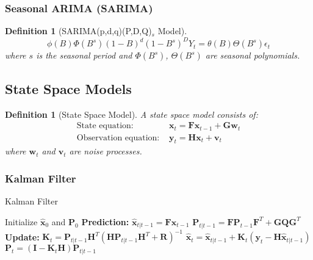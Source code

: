 \documentclass[11pt,a4paper]{article}
\newtheorem{definition}[theorem]{Definition}
\begin{document}
\subsubsection{Seasonal ARIMA (SARIMA)}

\begin{definition}[SARIMA(p,d,q)(P,D,Q)$_s$ Model]
$$\phi(B)\Phi(B^s)(1-B)^d(1-B^s)^D Y_t = \theta(B)\Theta(B^s)\epsilon_t$$
where $s$ is the seasonal period and $\Phi(B^s)$, $\Theta(B^s)$ are seasonal polynomials.
\end{definition}

\subsection{State Space Models}

\begin{definition}[State Space Model]
A state space model consists of:
\begin{align}
\text{State equation: } & \mathbf{x}_t = \mathbf{F}\mathbf{x}_{t-1} + \mathbf{G}\mathbf{w}_t \\
\text{Observation equation: } & \mathbf{y}_t = \mathbf{H}\mathbf{x}_t + \mathbf{v}_t
\end{align}
where $\mathbf{w}_t$ and $\mathbf{v}_t$ are noise processes.
\end{definition}

\subsubsection{Kalman Filter}

\begin{algorithm}
\caption{Kalman Filter}
\begin{algorithmic}[1]
\STATE Initialize $\hat{\mathbf{x}}_0$ and $\mathbf{P}_0$
    \STATE \textbf{Prediction:}
    \STATE $\hat{\mathbf{x}}_{t|t-1} = \mathbf{F}\hat{\mathbf{x}}_{t-1}$
    \STATE $\mathbf{P}_{t|t-1} = \mathbf{F}\mathbf{P}_{t-1}\mathbf{F}^T + \mathbf{G}\mathbf{Q}\mathbf{G}^T$
    \STATE \textbf{Update:}
    \STATE $\mathbf{K}_t = \mathbf{P}_{t|t-1}\mathbf{H}^T(\mathbf{H}\mathbf{P}_{t|t-1}\mathbf{H}^T + \mathbf{R})^{-1}$
    \STATE $\hat{\mathbf{x}}_t = \hat{\mathbf{x}}_{t|t-1} + \mathbf{K}_t(\mathbf{y}_t - \mathbf{H}\hat{\mathbf{x}}_{t|t-1})$
    \STATE $\mathbf{P}_t = (\mathbf{I} - \mathbf{K}_t\mathbf{H})\mathbf{P}_{t|t-1}$
\ENDFOR
\end{algorithmic}
\end{algorithm}
\end{document}
